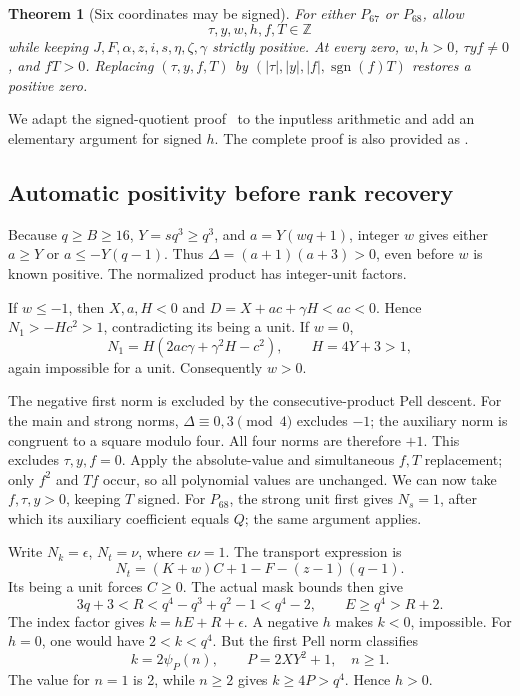 \documentclass[11pt,a4paper]{article}
\newtheorem{theorem}{Theorem}[section]
\theoremstyle{remark}\newtheorem{remark}[theorem]{Remark}
\newcommand{\ZZ}{\mathbb Z}
\newcommand{\src}[1]{{\small\path{#1}}}
\begin{document}
\begin{theorem}[Six coordinates may be signed]\label{thm:signed}
For either \(P_{67}\) or \(P_{68}\), allow
\[
 \tau,y,w,h,f,T\in\ZZ
\]
while keeping \(J,F,\alpha,z,i,s,\eta,\zeta,\gamma\) strictly positive.
At every zero, \(w,h>0\), \(\tau yf\ne0\), and \(fT>0\).
Replacing \((\tau,y,f,T)\) by
\((|\tau|,|y|,|f|,\operatorname{sgn}(f)T)\) restores a positive zero.
\end{theorem}

We adapt the signed-quotient proof~\cite{signedabs,signedsound} to the
inputless arithmetic and add an elementary argument for signed \(h\).
The complete proof is also provided as \src{proofs/signed_domain.md}.

\subsection{Automatic positivity before rank recovery}

Because \(q\ge B\ge16\), \(Y=sq^3\ge q^3\), and
\(a=Y(wq+1)\), integer \(w\) gives either \(a\ge Y\) or
\(a\le-Y(q-1)\). Thus \(\Delta=(a+1)(a+3)>0\), even before
\(w\) is known positive. The normalized product has integer-unit factors.

If \(w\le-1\), then \(X,a,H<0\) and
\(D=X+ac+\gamma H<ac<0\). Hence
\(N_1> -Hc^2>1\), contradicting its being a unit. If \(w=0\),
\[
 N_1=H(2ac\gamma+\gamma^2H-c^2),\qquad H=4Y+3>1,
\]
again impossible for a unit. Consequently \(w>0\).

The negative first norm is excluded by the consecutive-product Pell
descent. For the main and strong norms, \(\Delta\equiv0,3\pmod4\)
excludes \(-1\); the auxiliary norm is congruent to a square modulo four.
All four norms are therefore \(+1\). This excludes \(\tau,y,f=0\).
Apply the absolute-value and simultaneous \(f,T\) replacement; only
\(f^2\) and \(Tf\) occur, so all polynomial values are unchanged.
We can now take \(f,\tau,y>0\), keeping \(T\) signed.
For \(P_{68}\), the strong unit first gives \(N_s=1\), after which its
auxiliary coefficient equals \(Q\); the same argument applies.

Write \(N_k=\epsilon\), \(N_t=\nu\), where
\(\epsilon\nu=1\). The transport expression is
\[
 N_t=(K+w)C+1-F-(z-1)(q-1).
\]
Its being a unit forces \(C\ge0\). The actual mask bounds then give
\begin{equation}
 3q+3<R<q^4-q^3+q^2-1<q^4-2,
 \qquad E\ge q^4>R+2.\label{eq:weakbounds}
\end{equation}
The index factor gives \(k=hE+R+\epsilon\). A negative \(h\) makes
\(k<0\), impossible. For \(h=0\), one would have \(2<k<q^4\).
But the first Pell norm classifies
\[
 k=2\psi_{P}(n),\qquad P=2XY^2+1,\quad n\ge1.
\]
The value for \(n=1\) is 2, while \(n\ge2\) gives
\(k\ge4P>q^4\). Hence \(h>0\).
\end{document}

